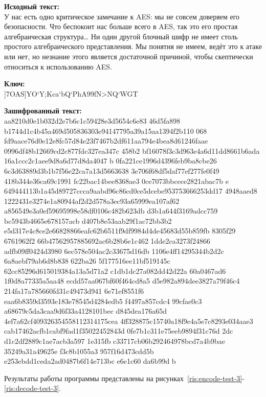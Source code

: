 \textbf{Исходный текст:} \\
    У нас есть одно критическое замечание к AES: мы не совсем доверяем
    его безопасности. Что беспокоит нас больше всего в AES, так это его
    простая алгебраическая структура… Ни один другой блочный шифр не имеет
    столь простого алгебраического представления. Мы понятия не имеем, ведёт
    это к атаке или нет, но незнание этого является достаточной причиной,
    чтобы скептически относиться к использованию AES. 

\textbf{Ключ:} \\
    ]7OAS]YO`Y;Kca`bQ`PhA99fN>NQ`WGT

\textbf{Зашифрованный текст:} \\
    aa8210d0e1b032d2e7b6c1c59428e3d5654c6e83 46d5fa898 b1744d1c4b45a469d505836303e94147795a39a15aa1394f2b110 068 fd9aace76d0e12e8fc57d84e23f7467b2df611aa794e4bea8d61246faae 0996df48b12669cd2c877fdc327ea347c 458b2 bf16078f3c3d963e4a6d11dd8661b6ada 16a1ccc2c1aee9d8a6d77d8da4047 b 0fa221ce1996d4396feb9ba8cbe26 6c3d63889d3b1b7f56e22ca7a13d5663638 3e706f68df5daf77ef277fe0f49 418b344e36ca69c1991 fc22bac14bee8368ae3 0ce7073bbcece2821abac7b e 649444113b1a45d89727ccca9aabd96c86cd0ce5dcebe953753666253dd17 4948aaed8 1222431e3274e1a80944af2d2d578a3ec93a65999ea107af62 a856549e3a0ef59695998e58df0106c482b623db d3b1a644f3169adcc759 bc5943b4665e678157acb d407b8e53aab29f1ac72bb3b2 e5d317e4c8ce2e66828866eafc62b6511f9df9984d4de45683d55b859fb 8305f29 6761962f2 66b47562957885692ac6b28b6e1c462 1dde2ca3273f24866 adfb09ff0424d3980 6ec578e504ac2c33675d16db 1106e4ff14295344b2d2c 6a8aebf79ab6d8b838 622ba26 5f177516ee11bf519145c 62cc85296d615019384a13a5d71a2 c1db1dc27a082dd42d22a 60a0467ad6 1f0d8a77335a5aa48 ecdd57aa067bf60f464cd8a5 d5e982a894dee3827a79f46c4 214fa17a785660fd31c49473d941 6e71ef8551f6 eaa6b8359d3593e183e78545d4284edb5 f4497a857cdc4 99cfae0c3 a68679c5da3caa9d6f33a4128101bec d845dea176a65d 4ef7a62cf409326354558112314175cea 4ff328875c15740a18f9e4a5e7c8293e034aae3 cab17462acfb1cabf9fad1f35022452843d 0fe7b1c311e75eeb9894f31c76d 2dc d1c2df2889c1ae7acb3a597 1e315fb c33717cb06b292464978bcd7a4b9bae 35249a31a49625e f3c8b1055a3 957f16d473cdd5b e253ebdd1ceda2ad0487b6f14e713bc e6e1c60 da6b99d b

Результаты работы программы представлены на рисунках~\ref{ris:encode-test-3}-\ref{ris:decode-test-3}.

